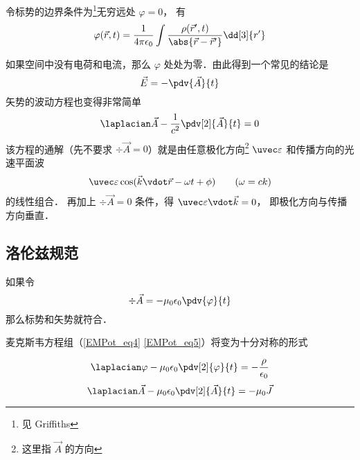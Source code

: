 令标势的边界条件为\footnote{见 Griffiths}无穷远处 $\varphi = 0$， 有
\begin{equation}
\varphi(\vec r, t) = \frac{1}{4\pi\epsilon_0} \int \frac{\rho(\vec r', t)}{\abs{\vec r - \vec r'}} \dd[3]{r'}
\end{equation}

如果空间中没有电荷和电流，那么 $\varphi$ 处处为零．由此得到一个常见的结论是
\begin{equation}
\vec E = - \pdv{\vec A}{t}
\end{equation}
矢势的波动方程也变得非常简单
\begin{equation}
\laplacian \vec A - \frac{1}{c^2} \pdv[2]{\vec A}{t} = 0
\end{equation}
该方程的通解（先不要求 $\div \vec A = 0$）就是由任意极化方向\footnote{这里指 $\vec A$ 的方向} $\uvec \varepsilon$ 和传播方向的光速平面波
\begin{equation}
\uvec \varepsilon \cos(\vec k \vdot \vec r - \omega t + \phi) \qquad (\omega = ck)
\end{equation}
的线性组合． 再加上 $\div \vec A = 0$ 条件，得 $\uvec \varepsilon \vdot \vec k = 0$， 即极化方向与传播方向垂直．

\subsection{洛伦兹规范}
如果令
\begin{equation}
\div \vec A = -\mu_0 \epsilon_0 \pdv{\varphi}{t}
\end{equation}
那么标势和矢势就符合． 

麦克斯韦方程组（\autoref{EMPot_eq4} \autoref{EMPot_eq5}）将变为十分对称的形式

\begin{equation}\label{Gauge_eq14}
\laplacian \varphi - \mu_0\epsilon_0 \pdv[2]{\varphi}{t} = -\frac{\rho}{\epsilon_0}
\end{equation}
\begin{equation}\label{Gauge_eq15}
\laplacian \vec A - \mu_0\epsilon_0 \pdv[2]{\vec A}{t} = -\mu_0 \vec J
\end{equation}
